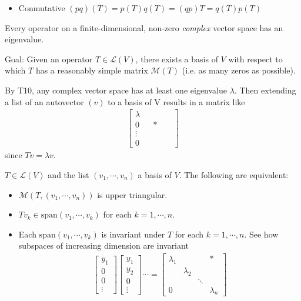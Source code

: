 \documentclass[11pt,notitlepage,oneside]{article}
\begin{document}
\begin{description}
\begin{itemize}
\item Conmutative $(pq)(T) = p(T)q(T) = (qp)T = q(T)p(T)$
\end{itemize}  
\item[T10\label{itm:T5_10}] Every operator on a finite-dimensional, non-zero \emph{complex} vector space has an eigenvalue.
%
\item Goal: Given an operator $T\in\mathcal{L}(V)$, there exists a basis of $V$ with respect to which $T$ has a reasonably simple matrix $\mathcal{M}(T)$ (i.e. as many zeros as possible).
\item By T10, any complex vector space has at least one eigenvalue $\lambda$. Then extending a list of an autovector $(v)$ to a basis of V results in a matrix like
\begin{align*}
\begin{bmatrix}
\lambda &&  && \\
0  && *  && \\
\vdots && &&  \\
0 &&  && 
\end{bmatrix}
\end{align*}
since $Tv = \lambda v$.
\item[P12] $T\in\mathcal{L}(V)$ and the list $(v_1,\cdots,v_n)$ a basis of $V$. The following are equivalent:
\begin{itemize}
\item $\mathcal{M}(T,(v_1,\cdots,v_n))$ is upper triangular.
\item $Tv_k\in\mathrm{span}(v_1,\cdots,v_k)$ for each $k=1,\cdots, n$.
\item Each $\mathrm{span}(v_1,\cdots,v_k)$ is invariant under $T$ for each $k=1,\cdots, n$. See how subspaces of increasing dimension are invariant
\begin{align*}
\begin{bmatrix}
y_1\\
0 \\
0 \\
\vdots
\end{bmatrix}
\begin{bmatrix}
y_1\\
y_2 \\
0 \\
\vdots
\end{bmatrix}
\cdots =
\begin{bmatrix}
\lambda_1 &  & & * \\
  & \lambda_2  & \\
  &  & \ddots & \\
0 & &        & \lambda_n

\end{bmatrix}
\end{align*}
\end{itemize}
\end{description}
\end{document}
